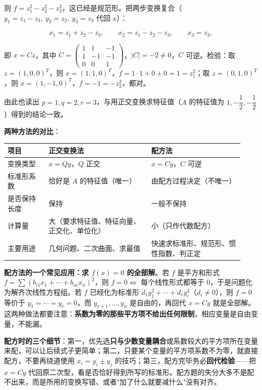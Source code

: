 \documentclass[11pt,openany,UTF8]{ctexbook}
\begin{document}
则 $f=z_1^2-z_2^2-z_3^2$，这已经是规范形。把两步变换复合（$y_1=z_1-z_3,\ y_2=z_2,\ y_3=z_3$ 代回 $x$）：

\[x_1=z_1+z_2-z_3,\qquad x_2=z_1-z_2-z_3,\qquad x_3=z_3,\]

即 $x=Cz$，其中 $C=\begin{pmatrix}1&1&-1\\1&-1&-1\\0&0&1\end{pmatrix}$，$\vert C\vert=-2\neq0$，$C$ 可逆。检验：取 $z=(1,0,0)^T$，则 $x=(1,1,0)^T$，$f=1\cdot1+0+0=1=z_1^2$；取 $z=(0,1,0)^T$，则 $x=(1,-1,0)^T$，$f=-1=-z_2^2$，都对。

由此也读出 $p=1,q=2,r=3$，与用正交变换求特征值（$A$ 的特征值为 $1,-\dfrac12,-\dfrac12$）得到的结论一致。

\textbf{两种方法的对比}：

\begingroup\small\setlength{\tabcolsep}{4.0pt}
\begin{longtable}{@{}L{0.1663\linewidth}L{0.4019\linewidth}L{0.3603\linewidth}@{}}
\toprule
\textbf{项目} & \textbf{正交变换法} & \textbf{配方法} \\
\midrule
\endhead
变换类型 & $x=Qy$，$Q$ 正交 & $x=Cy$，$C$ 可逆 \\
标准形系数 & 恰好是 $A$ 的特征值（唯一） & 由配方过程决定（不唯一） \\
是否保持长度 & 保持 & 一般不保持 \\
计算量 & 大（要求特征值、特征向量、正交化、单位化） & 小（只作代数配方） \\
主要用途 & 几何问题、二次曲面、求最值 & 快速求标准形、规范形、惯性指数、判正定 \\
\bottomrule
\end{longtable}
\endgroup

\textbf{配方法的一个常见应用：求 $f(x)=0$ 的全部解}。若 $f$ 是平方和形式 $f=\sum(b_{i1}x_1+\cdots+b_{in}x_n)^2$，则 $f=0\iff$ 每个线性形式都等于 $0$，于是问题化为解齐次线性方程组。若 $f$ 已经化为标准形 $d_1y_1^2+\cdots+d_ry_r^2$（$d_i\neq0$），则 $f=0$ 等价于 $y_1=\cdots=y_r=0$，而 $y_{r+1},\dots,y_n$ 是自由的，再回代 $x=Cy$ 就是全部解。这两种做法都要注意：\textbf{系数为零的那些平方项不给出任何限制}，相应变量是自由变量，不能漏。

\textbf{配方时的三个细节}：第一，优先选\textbf{只与少数变量耦合}或系数较大的平方项所在变量来配，可以让后续式子更简单；第二，只要某个变量的平方项系数不为零，就直接配方，不要再绕道使用 $x_i=y_i\pm y_j$ 的技巧；第三，配方完毕务必\textbf{回代检验}——把 $x=Cy$ 代回原二次型，看是否恰好得到所写的标准形。配方题的失分大多不是配不出来，而是所用的变换写错、或者"加了什么就要减什么"没有对齐。
\end{document}
